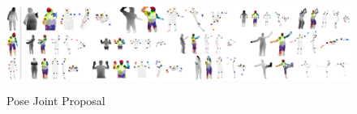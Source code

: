 \begin{figure}
	[h] \centering 
	\includegraphics[height=3cm]{figures/content/ni-pose.png} \caption{Pose Joint Proposal} \label{fg:ni:pose} 
\end{figure}
